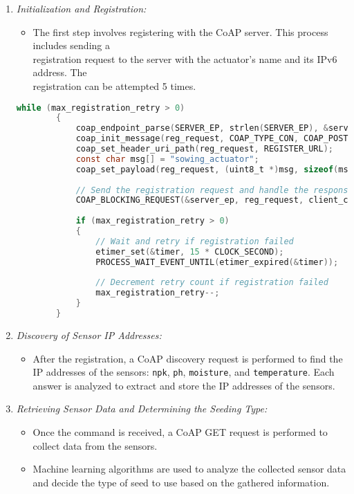 \begin{enumerate}
    \item \textit{Initialization and Registration:}
    \begin{itemize}
        \item The first step involves registering with the CoAP server. This process includes sending a\\
         registration request to the server with the actuator's name and its IPv6 address. The\\
         registration can be attempted 5 times.
    \end{itemize}

    \begin{lstlisting}[language=C]
        while (max_registration_retry > 0)
        {
            coap_endpoint_parse(SERVER_EP, strlen(SERVER_EP), &server_ep);
            coap_init_message(reg_request, COAP_TYPE_CON, COAP_POST, 0);
            coap_set_header_uri_path(reg_request, REGISTER_URL);
            const char msg[] = "sowing_actuator";
            coap_set_payload(reg_request, (uint8_t *)msg, sizeof(msg) - 1);
        
            // Send the registration request and handle the response
            COAP_BLOCKING_REQUEST(&server_ep, reg_request, client_chunk_handler);
        
            if (max_registration_retry > 0)
            {
                // Wait and retry if registration failed
                etimer_set(&timer, 15 * CLOCK_SECOND);
                PROCESS_WAIT_EVENT_UNTIL(etimer_expired(&timer));
        
                // Decrement retry count if registration failed
                max_registration_retry--;
            }
        }
    \end{lstlisting}
    
    \item \textit{Discovery of Sensor IP Addresses:}
    \begin{itemize}
        \item After the registration, a CoAP discovery request is performed to find the IP addresses of the sensors: \texttt{npk}, \texttt{ph}, \texttt{moisture}, and \texttt{temperature}. Each answer is analyzed to extract and store the IP addresses of the sensors.
    \end{itemize}
    
    \item \textit{Retrieving Sensor Data and Determining the Seeding Type:}
    \begin{itemize}
        \item Once the command is received, a CoAP GET request is performed to collect data from the sensors.
        \item Machine learning algorithms are used to analyze the collected sensor data and decide the type of seed to use based on the gathered information.
    \end{itemize}
    

\end{enumerate}
